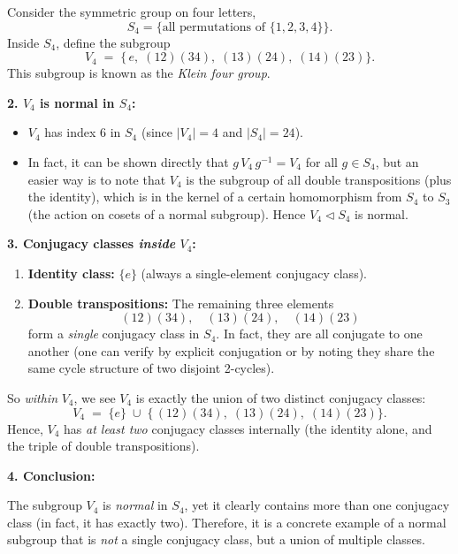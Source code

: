 \documentclass[12pt]{article}
\theoremstyle{definition} %
\theoremstyle{plain} %
\begin{document}
Consider the symmetric group on four letters,
\[
S_4 = \{ \text{all permutations of } \{1,2,3,4\} \}.
\]
Inside $S_4$, define the subgroup
\[
V_4 \;=\; \{\, e,\;(12)(34),\;(13)(24),\;(14)(23)\}.
\]
This subgroup is known as the \emph{Klein four group}.

\bigskip

\noindent
\textbf{2. $V_4$ is normal in $S_4$:}

\begin{itemize}
    \item $V_4$ has index 6 in $S_4$ (since $|V_4|=4$ and $|S_4|=24$).
    \item In fact, it can be shown directly that $g\,V_4\,g^{-1} = V_4$ for all $g \in S_4$, but an easier way is to note that $V_4$ is the subgroup of all double transpositions (plus the identity), which is in the kernel of a certain homomorphism from $S_4$ to $S_3$ (the action on cosets of a normal subgroup). Hence $V_4 \triangleleft S_4$ is normal.
\end{itemize}

\bigskip

\noindent
\textbf{3. Conjugacy classes \emph{inside} $V_4$:}

\begin{enumerate}
    \item \textbf{Identity class:} $\{e\}$ (always a single-element conjugacy class).
    \item \textbf{Double transpositions:} The remaining three elements 
    \[
    (12)(34),\quad (13)(24),\quad (14)(23)
    \]
    form a \emph{single} conjugacy class in $S_4$. In fact, they are all conjugate to one another (one can verify by explicit conjugation or by noting they share the same cycle structure of two disjoint 2-cycles).
\end{enumerate}

So \emph{within} $V_4$, we see $V_4$ is exactly the union of two distinct conjugacy classes:
\[
V_4 
\;=\; \{e\} 
\;\cup\; \{\,(12)(34),\;(13)(24),\;(14)(23)\}.
\]
Hence, $V_4$ has \emph{at least two} conjugacy classes internally (the identity alone, and the triple of double transpositions).

\bigskip

\noindent
\textbf{4. Conclusion:} 

The subgroup $V_4$ is \emph{normal} in $S_4$, yet it clearly contains more than one conjugacy class (in fact, it has exactly two). Therefore, it is a concrete example of a normal subgroup that is \emph{not} a single conjugacy class, but a union of multiple classes.
\end{document}
